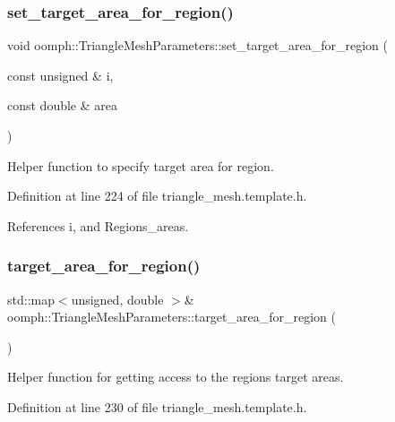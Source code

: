 \subsubsection{\texorpdfstring{set\+\_\+target\+\_\+area\+\_\+for\+\_\+region()}{set\_target\_area\_for\_region()}}
{\footnotesize\ttfamily void oomph\+::\+Triangle\+Mesh\+Parameters\+::set\+\_\+target\+\_\+area\+\_\+for\+\_\+region (\begin{DoxyParamCaption}\item[{const unsigned \&}]{i,  }\item[{const double \&}]{area }\end{DoxyParamCaption})\hspace{0.3cm}{\ttfamily [inline]}}



Helper function to specify target area for region. 



Definition at line 224 of file triangle\+\_\+mesh.\+template.\+h.



References i, and Regions\+\_\+areas.

\mbox{\label{classoomph_1_1TriangleMeshParameters_a1f38f20f3b22c9e74cefe2a878614f69}} 
\subsubsection{\texorpdfstring{target\+\_\+area\+\_\+for\+\_\+region()}{target\_area\_for\_region()}}
{\footnotesize\ttfamily std\+::map$<$unsigned, double $>$\& oomph\+::\+Triangle\+Mesh\+Parameters\+::target\+\_\+area\+\_\+for\+\_\+region (\begin{DoxyParamCaption}{ }\end{DoxyParamCaption})\hspace{0.3cm}{\ttfamily [inline]}}



Helper function for getting access to the region\textquotesingle{}s target areas. 



Definition at line 230 of file triangle\+\_\+mesh.\+template.\+h.



